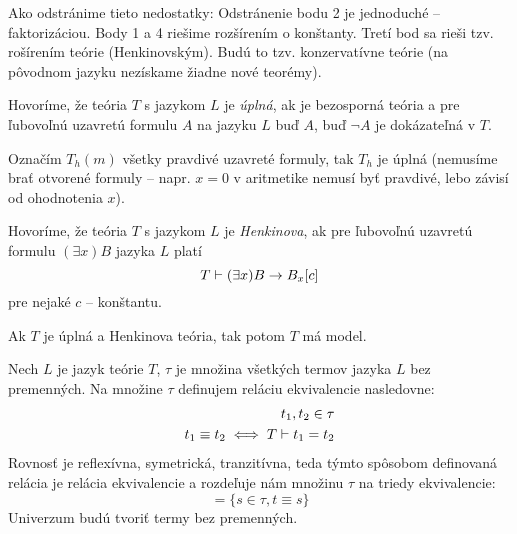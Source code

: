 Ako odstránime tieto nedostatky:
Odstránenie bodu 2 je jednoduché --  faktorizáciou. Body 1 a 4 riešime
rozšírením o konštanty. Tretí bod sa rieši tzv. rošírením teórie (Henkinovským).
Budú to tzv.  konzervatívne teórie (na pôvodnom jazyku nezískame žiadne nové
teorémy).

\begin{definicia}
    Hovoríme, že teória $T$ s jazykom $L$ je \emph{úplná}, ak je
    bezosporná teória a pre ľubovoľnú uzavretú formulu $A$ na jazyku
    $L$ buď $A$, buď $\neg A$ je dokázateľná v $T$.
\end{definicia}    

\par Označím $T_h(m)$ všetky pravdivé uzavreté formuly, tak $T_h$ je úplná
(nemusíme brať otvorené formuly -- napr. $x=0$ v aritmetike nemusí byť pravdivé,
lebo závisí od ohodnotenia $x$).

\begin{definicia}
    Hovoríme, že teória $T$ s jazykom $L$ je \emph{Henkinova}, ak pre
    ľubovoľnú uzavretú formulu $(\exists x)B$ jazyka $L$ platí
    \begin{equation}
        T \vdash (\exists x)B \rightarrow B_x[c]
    \end{equation}
    pre nejaké $c$ -- konštantu.
\end{definicia}

\begin{lema}
    Ak $T$ je úplná a Henkinova teória, tak potom $T$ má model.
\end{lema}
\begin{dokaz}
    Nech $L$ je jazyk teórie $T$, $\tau$ je množina všetkých
    termov jazyka $L$ bez premenných. Na množine $\tau$ definujem reláciu
    ekvivalencie nasledovne:
    \begin{eqnarray*}
	t_1, t_2 \in \tau \\
	t_1 \equiv t_2 \iff T \vdash t_1 = t_2
    \end{eqnarray*}
    Rovnosť je reflexívna, symetrická, tranzitívna, teda týmto
    spôsobom definovaná relácia je relácia ekvivalencie a rozdeľuje
    nám množinu $\tau$ na triedy ekvivalencie:
    \begin{equation}
	[t] = \{ s \in \tau, t \equiv s\}
    \end{equation}
    Univerzum budú tvoriť termy bez premenných.
\end{dokaz}

